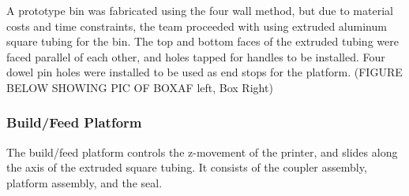 \documentclass[11pt]{article}
\begin{document}
A prototype bin was fabricated using the four wall method, but due to material costs and time constraints, the team proceeded with using extruded aluminum square tubing for the bin. The top and bottom faces of the extruded tubing were faced parallel of each other, and holes tapped for handles to be installed. Four dowel pin holes were installed to be used as end stops for the platform.  (FIGURE BELOW SHOWING PIC OF BOXAF left, Box Right)

\subsubsection{Build/Feed Platform}
The build/feed platform controls the z-movement of the printer, and slides along the axis of the extruded square tubing. It consists of the coupler assembly, platform assembly, and the seal.
\end{document}
